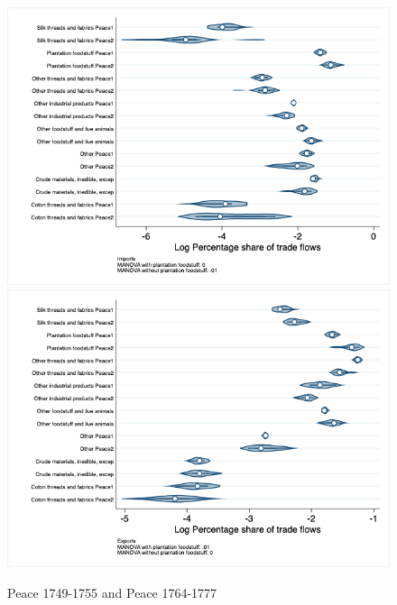 \documentclass[12pt,a4paper,notitlepage,english]{article}
\begin{document}
\begin{appendix}
\begin{figure}[h!]
\centering
\caption{Peace 1749-1755 and Peace 1764-1777}
\label{seven_peace1764_1777_nat_distr_aggr}
\includegraphics[scale=.4]{peace1749_1755_peace1764_1777_nat_distr_Iaggr}
\includegraphics[scale=.4]{peace1749_1755_peace1764_1777_nat_distr_Xaggr}
\end{figure}


\end{appendix}
\end{document}
